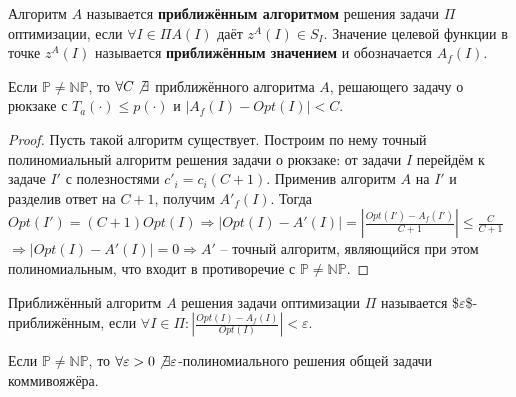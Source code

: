 \documentclass[11pt]{article}
\newcounter{th}\setcounter{th}{0}
\newcounter{stnmt}\setcounter{stnmt}{0}
\def\st{\par\smallskip\refstepcounter{stnmt}\textbf{\arabic{stnmt}}}
\newtheorem*{Statement}{Утверждение \st}
\begin{document}
Алгоритм \(A\) называется \textbf{приближённым алгоритмом} решения задачи \(\Pi\) оптимизации, если
\(\forall I \in \Pi A(I) \text{ даёт } z^A(I) \in S_I\). Значение целевой функции в точке \(z^A(I)\)
называется \textbf{приближённым значением} и обозначается \(A_f(I)\).
\begin{Statement}
Если $\mathbb{P} \neq \mathbb{NP}$, то $\forall C \not\exists$ приближённого алгоритма $A$,
решающего задачу о рюкзаке с $T_a(\cdot) \leq p(\cdot)$ и $|A_f(I) - Opt(I)| < C$.
\end{Statement}
\begin{proof}
Пусть такой алгоритм существует. Построим по нему точный полиномиальный алгоритм решения
задачи о рюкзаке: от задачи $I$ перейдём к задаче $I'$ с полезностями $c'_i = c_i(C + 1)$.
Применив алгоритм $A$ на $I'$ и разделив ответ на $C + 1$, получим $A'_f(I)$. Тогда
$Opt(I') = (C + 1)Opt(I) \Rightarrow |Opt(I) - A'(I)| = |\frac{Opt(I') - A_f(I')}{C + 1}| \leq \frac{C}{C + 1}$
$\Rightarrow |Opt(I) - A'(I)| = 0 \Rightarrow A'$ -- точный алгоритм, являющийся при этом
полиномиальным, что входит в противоречие с $\mathbb{P} \neq \mathbb{NP}$.
\end{proof}
Приближённый алгоритм \(A\) решения задачи оптимизации \(\Pi\) называется \$\(\varepsilon\)\$-приближённым,
если \(\forall I \in \Pi: |\frac{Opt(I) - A_f(I)}{Opt(I)}| < \varepsilon\).
\begin{Statement}
Если $\mathbb{P} \neq \mathbb{NP}$, то $\forall \varepsilon > 0 \not\exists \varepsilon$-полиномиального
решения общей задачи коммивояжёра.
\end{Statement}
\end{document}
